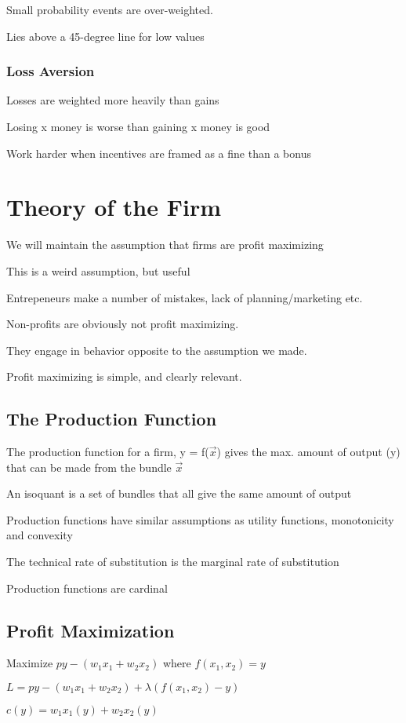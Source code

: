 \documentclass[12pt]{article}
\begin{document}
Small probability events are over-weighted.

Lies above a 45-degree line for low values

\subsubsection{Loss Aversion}

Losses are weighted more heavily than gains

Losing x money is worse than gaining x money is good

Work harder when incentives are framed as a fine than a bonus

\section{Theory of the Firm}

We will maintain the assumption that firms are profit maximizing

This is a weird assumption, but useful

Entrepeneurs make a number of mistakes, lack of planning/marketing etc.

Non-profits are obviously not profit maximizing.

They engage in behavior opposite to the assumption we made.

Profit maximizing is simple, and clearly relevant.

\subsection{The Production Function}

The production function for a firm, y = f($\vec{x}$) gives the max. amount of output (y) that can be made from the bundle $\vec{x}$

An isoquant is a set of bundles that all give the same amount of output

Production functions have similar assumptions as utility functions, monotonicity and convexity

The technical rate of substitution is the marginal rate of substitution

Production functions are cardinal

\subsection{Profit Maximization}

Maximize $py - (w_{1}x_{1} + w_{2}x_{2})$ where $f(x_{1},x_{2}) = y$

$L = py - (w_{1}x_{1} + w_{2}x_{2}) + \lambda(f(x_{1}, x_{2}) - y)$

$c(y) = w_{1}x_{1}(y) + w_{2}x_{2}(y)$
\end{document}
